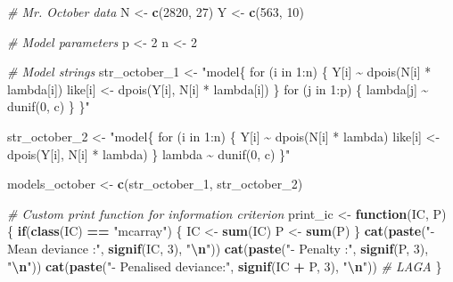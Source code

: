 \documentclass[
]{article}
\newenvironment{Shaded}{\begin{snugshade}}{\end{snugshade}}
\newcommand{\CommentTok}[1]{\textcolor[rgb]{0.56,0.35,0.01}{\textit{#1}}}
\newcommand{\ControlFlowTok}[1]{\textcolor[rgb]{0.13,0.29,0.53}{\textbf{#1}}}
\newcommand{\DecValTok}[1]{\textcolor[rgb]{0.00,0.00,0.81}{#1}}
\newcommand{\FunctionTok}[1]{\textcolor[rgb]{0.13,0.29,0.53}{\textbf{#1}}}
\newcommand{\NormalTok}[1]{#1}
\newcommand{\OtherTok}[1]{\textcolor[rgb]{0.56,0.35,0.01}{#1}}
\newcommand{\SpecialCharTok}[1]{\textcolor[rgb]{0.81,0.36,0.00}{\textbf{#1}}}
\newcommand{\StringTok}[1]{\textcolor[rgb]{0.31,0.60,0.02}{#1}}
\begin{document}
\begin{Shaded}
\begin{Highlighting}[]
\CommentTok{\# Mr. October data}
\NormalTok{N }\OtherTok{\textless{}{-}} \FunctionTok{c}\NormalTok{(}\DecValTok{2820}\NormalTok{, }\DecValTok{27}\NormalTok{)}
\NormalTok{Y }\OtherTok{\textless{}{-}} \FunctionTok{c}\NormalTok{(}\DecValTok{563}\NormalTok{,  }\DecValTok{10}\NormalTok{)}

\CommentTok{\# Model parameters}
\NormalTok{p  }\OtherTok{\textless{}{-}} \DecValTok{2}
\NormalTok{n  }\OtherTok{\textless{}{-}} \DecValTok{2}

\CommentTok{\# Model strings}
\NormalTok{str\_october\_1 }\OtherTok{\textless{}{-}} \StringTok{"model\{}
\StringTok{  for (i in 1:n) \{}
\StringTok{    Y[i]     \textasciitilde{} dpois(N[i] * lambda[i])}
\StringTok{    like[i] \textless{}{-} dpois(Y[i], N[i] * lambda[i])}
\StringTok{  \}}
\StringTok{  }
\StringTok{  for (j in 1:p) \{ lambda[j] \textasciitilde{} dunif(0, c) \}}
\StringTok{\}"}

\NormalTok{str\_october\_2 }\OtherTok{\textless{}{-}} \StringTok{"model\{}
\StringTok{  for (i in 1:n) \{}
\StringTok{    Y[i]     \textasciitilde{} dpois(N[i] * lambda)}
\StringTok{    like[i] \textless{}{-} dpois(Y[i], N[i] * lambda)}
\StringTok{  \}}
\StringTok{  }
\StringTok{  lambda \textasciitilde{} dunif(0, c)}
\StringTok{\}"}

\NormalTok{models\_october }\OtherTok{\textless{}{-}} \FunctionTok{c}\NormalTok{(str\_october\_1, str\_october\_2)}

\CommentTok{\# Custom print function for information criterion}
\NormalTok{print\_ic }\OtherTok{\textless{}{-}} \ControlFlowTok{function}\NormalTok{(IC, P) \{}
  \ControlFlowTok{if}\NormalTok{(}\FunctionTok{class}\NormalTok{(IC) }\SpecialCharTok{==} \StringTok{"mcarray"}\NormalTok{) \{ }
\NormalTok{    IC }\OtherTok{\textless{}{-}} \FunctionTok{sum}\NormalTok{(IC)}
\NormalTok{    P  }\OtherTok{\textless{}{-}} \FunctionTok{sum}\NormalTok{(P)}
\NormalTok{  \}}
  \FunctionTok{cat}\NormalTok{(}\FunctionTok{paste}\NormalTok{(}\StringTok{"{-} Mean deviance     :"}\NormalTok{, }\FunctionTok{signif}\NormalTok{(IC, }\DecValTok{3}\NormalTok{), }\StringTok{"}\SpecialCharTok{\textbackslash{}n}\StringTok{"}\NormalTok{))}
  \FunctionTok{cat}\NormalTok{(}\FunctionTok{paste}\NormalTok{(}\StringTok{"{-} Penalty           :"}\NormalTok{, }\FunctionTok{signif}\NormalTok{(P, }\DecValTok{3}\NormalTok{), }\StringTok{"}\SpecialCharTok{\textbackslash{}n}\StringTok{"}\NormalTok{))}
  \FunctionTok{cat}\NormalTok{(}\FunctionTok{paste}\NormalTok{(}\StringTok{"{-} Penalised deviance:"}\NormalTok{, }\FunctionTok{signif}\NormalTok{(IC }\SpecialCharTok{+}\NormalTok{ P, }\DecValTok{3}\NormalTok{), }\StringTok{"}\SpecialCharTok{\textbackslash{}n}\StringTok{"}\NormalTok{)) }\CommentTok{\# LAGA}
\NormalTok{\}}


\end{Highlighting}
\end{Shaded}
\end{document}
